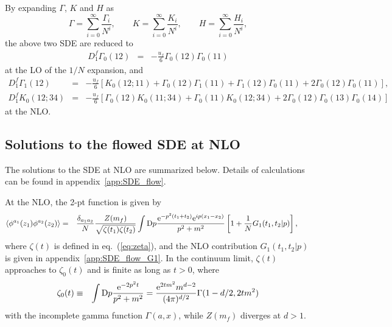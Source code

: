 \documentclass[preprint]{ptephy_v1}%
\newcommand{\rme}{{\rm e}}
\newcommand{\rmD}{{\rm D}}
\begin{document}
By expanding $\Gamma$, $K$ and $H$ as
\begin{equation}
\Gamma =\sum_{i=0}^\infty \frac{\Gamma_i}{N^i}, \qquad
K=\sum_{i=0}^\infty \frac{K_i}{N^i}, \qquad
H=\sum_{i=0}^\infty \frac{H_i}{N^i}, 
\end{equation}
the above two SDE are reduced to
\begin{eqnarray}
D_1^f \Gamma_0(12) &=& -\frac{u_f}{6} \Gamma_0(12)\Gamma_0(11)
\label{eq:SDE_LO}
\end{eqnarray}
at the LO of the $1/N$ expansion, and
\begin{eqnarray}
D_1^f \Gamma_1(12) &=& -\frac{u_f}{6}\left[K_0(12;11) +\Gamma_0(12)\Gamma_1(11)+
\Gamma_1(12)\Gamma_0(11) +2\Gamma_0(12)\Gamma_0(11)\right], ~~~~~ 
\label{eq:SDE_G1}\\
D_1^f K_0(12;34) &=&  -\frac{u_f}{6}\left[\Gamma_0(12) K_0(11;34) +\Gamma_0(11) K_0(12;34) 
+2\Gamma_0(12)\Gamma_0(13) \Gamma_0(14)\right] ~~~~~~~~
\label{eq:SDE_K0}
\end{eqnarray}
at the NLO.  


\subsection{Solutions to the flowed SDE at NLO}
The solutions to the SDE at NLO are summarized below. Details of calculations can be found in appendix~\ref{app:SDE_flow}.

At the NLO, the 2-pt function is given by
\begin{eqnarray}
\langle \phi^{a_1}(z_1) \phi^{a_2}(z_2) \rangle &=&\frac{\delta_{a_1a_2}}{N}
 \frac{Z(m_f)}{\sqrt{\zeta(t_1)\zeta(t_2)}}
  \int \rmD p \frac{\rme^{-p^2(t_1+t_2)}\rme^{i p(x_1-x_2)}}{p^2+m^2} 
\left[ 1+\frac{1}{N} G_1(t_1,t_2\vert p) \right], ~~~~~
\end{eqnarray}
where $\zeta(t)$ is defined in eq.~(\ref{eq:zeta}), and the NLO contribution $G_1(t_1,t_2\vert p)$
is given in appendix~\ref{app:SDE_flow_G1}.
In the continuum limit, $\zeta(t)$ approaches to $\zeta_0(t)$ and  is finite as long as $t> 0$,
where
\begin{eqnarray}
\zeta_0(t) &\equiv& \int \rmD p\frac{\rme^{-2p^2t}}{p^2+ m^2}=\frac{\rme^{2tm^2} m^{d-2}}{(4\pi)^{d/2}}\Gamma(1-d/2,2tm^2)
\label{eq:zeta0}
\end{eqnarray}
with the incomplete gamma function $\Gamma(a,x)$, while $Z(m_f)$ diverges at $d > 1$.
\end{document}
